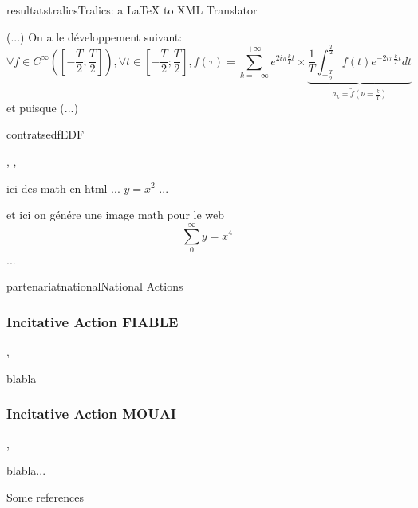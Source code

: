 \documentclass{ra2015}
\begin{document}
\begin{module}{resultats}{tralics}{Tralics: a LaTeX to XML Translator}

(...) On a le développement suivant:
\[ \forall f\in C^\infty\left(\left[-\frac{T}{2};\frac{T}{2}\right]\right),
   \forall t\in \left[-\frac{T}{2};\frac{T}{2}\right],
   f(\tau) = \sum_{k = -\infty}^{+\infty} e^{2i\pi\frac{k}{T}t} \times
   \underbrace{\frac{1}{T}
               \int_{-\frac{T}{2}}^{\frac{T}{2}} f(t) e^{-2i\pi\frac{k}{T}t} dt
              }_{a_k = \tilde{f}\left(\nu = \frac{k}{T}\right)}
\]
et puisque (...)

\end{module}

\begin{module}{contrats}{edf}{EDF}
\begin{participants}
, 
,
\end{participants}
ici des math en html 
... $y=x^2$ ...

et ici on génére une image math pour le web  
\begin{displaymath}
\sum_{0}^{\infty} y = x^4
\end{displaymath}
...

\end{module}



\begin{module}{partenariat}{national}{National Actions}

\subsubsection{Incitative Action  FIABLE}
\begin{participants}
,
\end{participants}

blabla

\subsubsection{Incitative Action  MOUAI}
\begin{participants}
, 
\end{participants}

blabla...

Some references 

\end{module}
\end{document}
